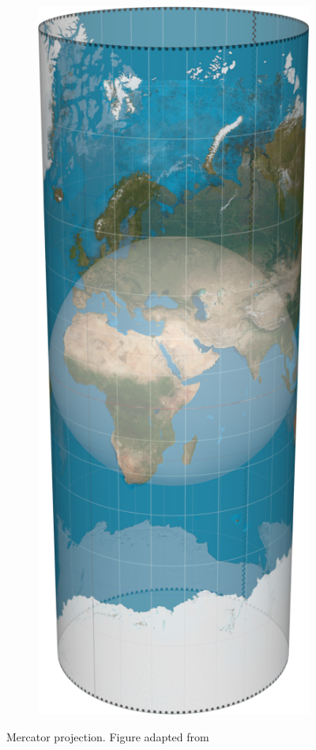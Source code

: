 \begin{figure}[htbp]
\begin{subfigure}[bt]{0.15\textwidth}
        \includegraphics[width=\textwidth]{figures/map_projection/projection_mercator.png}
    \end{subfigure}
    \caption{Mercator projection. Figure adapted from \cite{mapprojections}}
    \label{fig:proj_mercator}
\end{figure}

